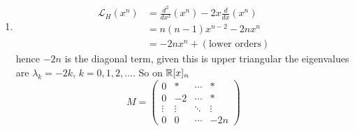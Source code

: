 \documentclass[10pt, a4paper]{article}
\begin{document}
\begin{problem}
\begin{solution}
\begin{enumerate}[label = (\alph*)]
            \item
            \begin{align*}
                \mathcal{L}_H(x ^ n) &= \frac{d ^ 2}{dx ^ 2}(x ^ n) - 2x\frac{d}{dx}(x ^ n) \\
                &= n(n - 1)x ^ {n - 2} - 2nx ^ n \\
                &= -2nx ^ n + (\text{lower orders})
            \end{align*}
            hence $-2n$ is the diagonal term,
            given this is upper triangular the eigenvalues are $\lambda_k = -2k$,
            $k = 0, 1, 2, \dotsc$.
            So on $\mathbb{R}[x]_n$
            \[
            M = \begin{pmatrix}
                0 & * & \dotsi & * \\
                0 & -2 & \dotsi & * \\
                \vdots & \vdots & \ddots & \vdots \\
                0 & 0 & \dotsi & -2n 
            \end{pmatrix}
            \]


\end{enumerate}
\end{solution}
\end{problem}
\end{document}
